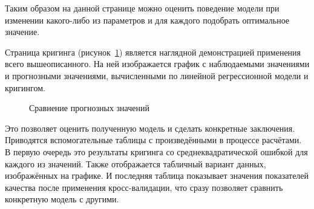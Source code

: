 Таким образом на данной странице можно оценить поведение модели при изменении какого-либо из параметров и для каждого подобрать оптимальное значение.

Страница кригинга (рисунок~\ref{img:mod_krige}) является наглядной демонстрацией применения всего вышеописанного. На ней изображается график с наблюдаемыми значениями и прогнозными значениями, вычисленными по линейной регрессионной модели и кригингом.
\begin{figure}[ht]
\caption{Сравнение прогнозных значений}
\label{img:mod_krige}
\end{figure}
Это позволяет оценить полученную модель и сделать конкретные заключения. Приводятся вспомогательные таблицы с произведёнными в процессе расчётами. В первую очередь это результаты кригинга со среднеквадратической ошибкой для каждого из значений. Также отображается табличный вариант данных, изображённых на графике. И последняя таблица показывает значения показателей качества после применения кросс-валидации, что сразу позволяет сравнить конкретную модель с другими.

